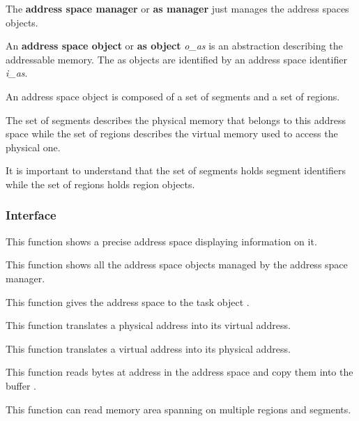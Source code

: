 The \textbf{address space manager} or \textbf{as manager} just manages
the address spaces objects.

An \textbf{address space object} or \textbf{as object} \textit{o\_as}
is an abstraction describing the addressable memory. The as objects
are identified by an address space identifier \textit{i\_as}.

An address space object is composed of a set of segments and a set of regions.

The set of segments describes the physical memory that belongs to this
address space while the set of regions describes the virtual memory
used to access the physical one.

It is important to understand that the set of segments holds segment
identifiers while the set of regions holds region objects.

%
%

\subsubsection{Interface}

	 {
	   This function shows a precise address space displaying
	   information on it.
	 }

	 {
	   This function shows all the address space objects managed by
	   the address space manager.
	 }

	 {
	   This function gives the address space  to the
	   task object .
	 }

	 {
	   This function translates a physical address into its virtual
	   address.
	 }

	 {
	   This function translates a virtual address into its physical
	   address.
	 }

	 {
	   This function reads  bytes at address
	    in the address space  and
	   copy them into the buffer .

	   This function can read memory area spanning on multiple
	   regions and segments.

	 }

